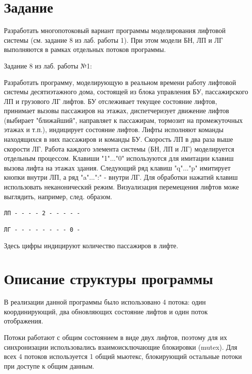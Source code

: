 \section*{Задание}

Разработать многопотоковый вариант программы моделирования лифтовой системы (см.
задание 8 из лаб. работы 1). При этом модели БН, ЛП и ЛГ выполняются в рамках
отдельных потоков программы.

Задание 8 из лаб. работы №1:

Разработать программу, моделирующую в реальном времени работу лифтовой системы
десятиэтажного дома, состоящей из блока управления БУ, пассажирского ЛП и
грузового ЛГ лифтов. БУ отслеживает текущее состояние лифтов, принимает вызовы
пассажиров на этажах, диспетчеризует движение лифтов (выбирает "ближайший",
направляет к пассажирам, тормозит на промежуточных этажах и т.п.), индицирует
состояние лифтов. Лифты исполняют команды находящихся в них пассажиров и команды
БУ. Скорость ЛП в два раза выше скорости ЛГ. Работа каждого элемента системы
(БН, ЛП и ЛГ) моделируется отдельным процессом. Клавиши "1"..."0" используются
для имитации клавиш вызова лифта на этажах здания. Следующий ряд клавиш
"q"..."p" имитирует кнопки внутри ЛП, а ряд "a"...":" - внутри ЛГ. Для обработки
нажатий клавиш использовать неканонический режим. Визуализация перемещения
лифтов може выглядить, например, след. образом.

\texttt{ЛП - - - - 2 - - - - -}

\texttt{ЛГ - - - - - - - - 0 -}

Здесь цифры индицируют количество пассажиров в лифте.


\newpage

\section*{Описание структуры программы}

В реализации данной программы было использовано 4 потока: один координирующий,
два обновляющих состояние лифтов и один поток отображения.

Потоки работают с общим состоянием в виде двух лифтов, поэтому для их
синхронизации использовались взаимоисключающие блокировки (mutex). Для всех 4
потоков используется 1 общий мьютекс, блокирующий остальные потоки при доступе к
общим данным.

